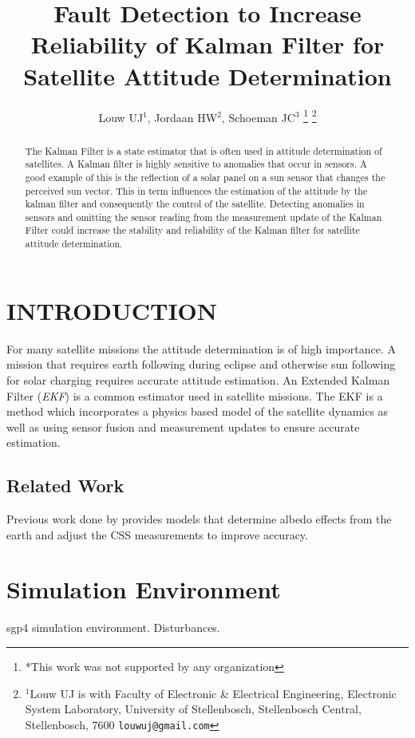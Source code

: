 \documentclass[letterpaper, 10 pt, conference]{ieeeconf}  %
\title{\LARGE \bf
Fault Detection to Increase Reliability of Kalman Filter for Satellite Attitude Determination
}
\author{Louw UJ$^{1}$, Jordaan HW$^{2}$, Schoeman JC$^{3}$%
\thanks{*This work was not supported by any organization}%
\thanks{$^{1}$Louw UJ is with Faculty of Electronic \& Electrical Engineering, Electronic System            Laboratory, University of Stellenbosch, Stellenbosch Central, Stellenbosch, 7600
        {\tt\small louwuj@gmail.com}}%
}
\begin{document}
\maketitle
\thispagestyle{empty}
\pagestyle{empty}


\begin{abstract}

The Kalman Filter is a state estimator that is often used in attitude determination of satellites. A Kalman filter is highly sensitive to anomalies that occur in sensors. A good example of this is the reflection of a solar panel on a sun sensor that changes the perceived sun vector. This in term influences the estimation of the attitude by the kalman filter and consequently the control of the satellite. Detecting anomalies in sensors and omitting the sensor reading from the measurement update of the Kalman Filter could increase the stability and reliability of the Kalman filter for satellite attitude determination.

\end{abstract}


\section{INTRODUCTION}
For many satellite missions the attitude determination is of high importance. A mission that requires earth following during eclipse and otherwise sun following for solar charging requires accurate attitude estimation. An Extended Kalman Filter (\emph{EKF}) is a common estimator used in satellite missions. The EKF is a method which incorporates a physics based model of the satellite dynamics as well as using sensor fusion and measurement updates to ensure accurate estimation. 

\subsection{Related Work}
Previous work done by \textcite{Cilden-Guler2021} provides models that determine albedo effects from the earth and adjust the CSS measurements to improve accuracy.

\section{Simulation Environment}
sgp4 simulation environment. Disturbances.
\end{document}

